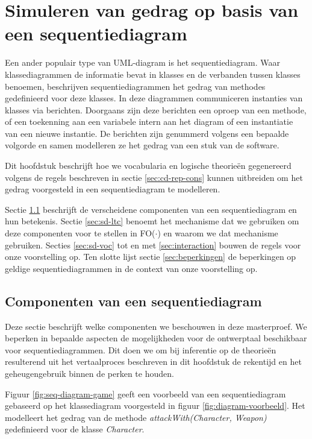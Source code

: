 \chapter{Simuleren van gedrag op basis van een sequentiediagram}\label{sec:gedrag}
Een ander populair type van UML-diagram is het sequentiediagram\cite{RumbaughJames2005Tuml}. Waar klassediagrammen de informatie bevat in klasses en de verbanden tussen klasses benoemen, beschrijven sequentiediagrammen het gedrag van methodes gedefinieerd voor deze klasses. In deze diagrammen communiceren instanties van klasses via berichten. Doorgaans zijn deze berichten een oproep van een methode, of een toekenning aan een variabele intern aan het diagram of een instantiatie van een nieuwe instantie. De berichten zijn genummerd volgens een bepaalde volgorde en samen modelleren ze het gedrag van een stuk van de software.

Dit hoofdstuk beschrijft hoe we vocabularia en logische theorie\"en gegenereerd volgens de regels beschreven in sectie \ref{sec:cd-rep-cons} kunnen uitbreiden om het gedrag voorgesteld in een sequentiediagram te modelleren.

Sectie \ref{sec:sd-components} beschrijft de verscheidene componenten van een sequentiediagram en hun betekenis. Sectie \ref{sec:sd-ltc} benoemt het mechanisme dat we gebruiken om deze componenten voor te stellen in FO($\cdot$) en waarom we dat mechanisme gebruiken. Secties \ref{sec:sd-voc} tot en met \ref{sec:interaction} bouwen de regels voor onze voorstelling op. Ten slotte lijst sectie \ref{sec:beperkingen} de beperkingen op geldige sequentiediagrammen in de context van onze voorstelling op.

\section{Componenten van een sequentiediagram}\label{sec:sd-components}

Deze sectie beschrijft welke componenten we beschouwen in deze masterproef. We beperken in bepaalde aspecten de mogelijkheden voor de ontwerptaal beschikbaar voor sequentiediagrammen. Dit doen we om bij inferentie op de theorie\"en resulterend uit het vertaalproces beschreven in dit hoofdstuk de rekentijd en het geheugengebruik binnen de perken te houden.

Figuur \ref{fig:seq-diagram-game} geeft een voorbeeld van een sequentiediagram gebaseerd op het klassediagram voorgesteld in figuur \ref{fig:diagram-voorbeeld}. Het modelleert het gedrag van de methode \textit{attackWith(Character, Weapon)} gedefinieerd voor de klasse \textit{Character}.

